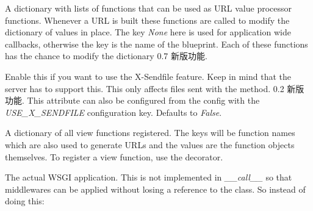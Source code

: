 \documentclass[a4paper,12pt]{sphinxmanual}
\begin{document}
\begin{fulllineitems}
\begin{fulllineitems}
\end{fulllineitems}


\begin{fulllineitems}
\label{api:flask.Flask.url_value_preprocessors}
A dictionary with lists of functions that can be used as URL
value processor functions.  Whenever a URL is built these functions
are called to modify the dictionary of values in place.  The key
\emph{None} here is used for application wide
callbacks, otherwise the key is the name of the blueprint.
Each of these functions has the chance to modify the dictionary
0.7 新版功能.
\end{fulllineitems}


\begin{fulllineitems}
\label{api:flask.Flask.use_x_sendfile}
Enable this if you want to use the X-Sendfile feature.  Keep in
mind that the server has to support this.  This only affects files
sent with the {\hyperref[api:flask.send_file]{}} method.
0.2 新版功能.
This attribute can also be configured from the config with the
\emph{USE\_X\_SENDFILE} configuration key.  Defaults to \emph{False}.

\end{fulllineitems}


\begin{fulllineitems}
\label{api:flask.Flask.view_functions}
A dictionary of all view functions registered.  The keys will
be function names which are also used to generate URLs and
the values are the function objects themselves.
To register a view function, use the {\hyperref[api:flask.Flask.route]{}} decorator.

\end{fulllineitems}


\begin{fulllineitems}
\label{api:flask.Flask.wsgi_app}
The actual WSGI application.  This is not implemented in
\emph{\_\_call\_\_} so that middlewares can be applied without losing a
reference to the class.  So instead of doing this:


\end{fulllineitems}
\end{fulllineitems}
\end{document}
